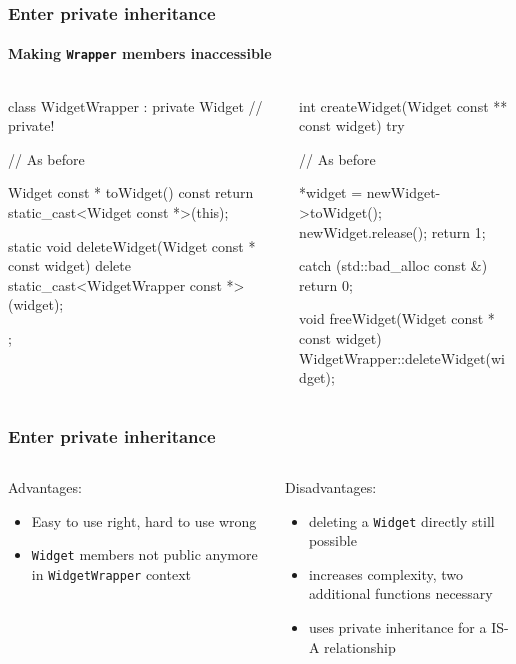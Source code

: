 \documentclass{beamer}
\def\code#1{\texttt{#1}}
\def\titleinframe#1{{\usebeamercolor[fg]{structure} #1}}
\begin{document}
\begin{frame}[fragile]
\frametitle{Enter private inheritance}
\framesubtitle{Making \code{Wrapper} members inaccessible}
\begin{columns}
\begin{column}{0.45\textwidth}
\begin{TinyC++}
class WidgetWrapper : private Widget // private!
{
	// As before
	
	Widget const * toWidget() const
	{
		return static_cast<Widget const *>(this);
	}
	
	static void deleteWidget(Widget const * const widget)
	{
		delete static_cast<WidgetWrapper const *>(widget);
	}
};
\end{TinyC++}
\end{column}
\begin{column}{0.45\textwidth}
\begin{TinyC++}
int createWidget(Widget const ** const widget)
try
{
	// As before
    
	*widget = newWidget->toWidget();
	newWidget.release();
	return 1;
}
catch (std::bad_alloc const &)
{
	return 0;
}

void freeWidget(Widget const * const widget)
{
	WidgetWrapper::deleteWidget(widget);
}
\end{TinyC++}
\end{column}
\end{columns}
\end{frame}


\begin{frame}[fragile]
\frametitle{Enter private inheritance}
\begin{columns}[T]
\begin{column}{0.45\textwidth}
	\titleinframe{Advantages:}
	
	\medskip
	\begin{itemize}
	\item Easy to use right, hard to use wrong
	\item \code{Widget} members not public anymore in \code{WidgetWrapper} context
	\end{itemize}
\end{column}
\begin{column}{0.45\textwidth}
	\titleinframe{Disadvantages:}
	
	\medskip
	\begin{itemize}
	\item deleting a \code{Widget} directly still possible
	\item increases complexity, two additional functions necessary
	\item uses private inheritance for a IS-A relationship
	\end{itemize}
\end{column}
\end{columns}
\end{frame}

\end{document}
